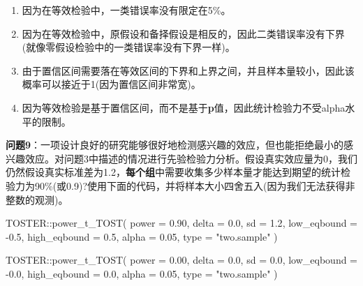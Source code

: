\documentclass[
  letterpaper,
  DIV=11,
  numbers=noendperiod]{scrreprt}
\newenvironment{Shaded}{\begin{snugshade}}{\end{snugshade}}
\newcommand{\AttributeTok}[1]{\textcolor[rgb]{0.40,0.45,0.13}{#1}}
\newcommand{\FloatTok}[1]{\textcolor[rgb]{0.68,0.00,0.00}{#1}}
\newcommand{\FunctionTok}[1]{\textcolor[rgb]{0.28,0.35,0.67}{#1}}
\newcommand{\NormalTok}[1]{\textcolor[rgb]{0.00,0.23,0.31}{#1}}
\newcommand{\SpecialCharTok}[1]{\textcolor[rgb]{0.37,0.37,0.37}{#1}}
\newcommand{\StringTok}[1]{\textcolor[rgb]{0.13,0.47,0.30}{#1}}
\providecommand{\tightlist}{%
  \setlength{\itemsep}{0pt}\setlength{\parskip}{0pt}}\usepackage{longtable,booktabs,array}
\begin{document}
\begin{enumerate}
\def\labelenumi{\Alph{enumi})}
\tightlist
\item
  因为在等效检验中，一类错误率没有限定在5\%。
\item
  因为在等效检验中，原假设和备择假设是相反的，因此二类错误率没有下界(就像零假设检验中的一类错误率没有下界一样)。
\item
  由于置信区间需要落在等效区间的下界和上界之间，并且样本量较小，因此该概率可以接近于1(因为置信区间非常宽)。
\item
  因为等效检验是基于置信区间，而不是基于\textbf{p}值，因此统计检验力不受alpha水平的限制。
\end{enumerate}

\textbf{问题9}：一项设计良好的研究能够很好地检测感兴趣的效应，但也能拒绝最小的感兴趣效应。对问题3中描述的情况进行先验检验力分析。假设真实效应量为0，我们仍然假设真实标准差为1.2，\textbf{每个组}中需要收集多少样本量才能达到期望的统计检验力为90\%(或0.9)?使用下面的代码，并将样本大小四舍五入(因为我们无法获得非整数的观测)。

\begin{Shaded}
\begin{Highlighting}[]
\NormalTok{TOSTER}\SpecialCharTok{::}\FunctionTok{power\_t\_TOST}\NormalTok{(}
  \AttributeTok{power =} \FloatTok{0.90}\NormalTok{,}
  \AttributeTok{delta =} \FloatTok{0.0}\NormalTok{,}
  \AttributeTok{sd =} \FloatTok{1.2}\NormalTok{,}
  \AttributeTok{low\_eqbound =} \SpecialCharTok{{-}}\FloatTok{0.5}\NormalTok{,}
  \AttributeTok{high\_eqbound =} \FloatTok{0.5}\NormalTok{,}
  \AttributeTok{alpha =} \FloatTok{0.05}\NormalTok{,}
  \AttributeTok{type =} \StringTok{"two.sample"}
\NormalTok{)}
\end{Highlighting}
\end{Shaded}

\begin{Shaded}
\begin{Highlighting}[]
\NormalTok{TOSTER}\SpecialCharTok{::}\FunctionTok{power\_t\_TOST}\NormalTok{(}
  \AttributeTok{power =} \FloatTok{0.00}\NormalTok{,}
  \AttributeTok{delta =} \FloatTok{0.0}\NormalTok{,}
  \AttributeTok{sd =} \FloatTok{0.0}\NormalTok{,}
  \AttributeTok{low\_eqbound =} \SpecialCharTok{{-}}\FloatTok{0.0}\NormalTok{,}
  \AttributeTok{high\_eqbound =} \FloatTok{0.0}\NormalTok{,}
  \AttributeTok{alpha =} \FloatTok{0.05}\NormalTok{,}
  \AttributeTok{type =} \StringTok{"two.sample"}
\NormalTok{)}
\end{Highlighting}
\end{Shaded}
\end{document}
